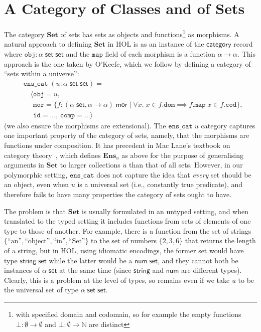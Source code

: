 \documentclass[twoside,titlepage,11pt]{article}
\begin{document}
\section{A Category of Classes and of Sets}%
\label{Set}
\newcommand{\Set}{\ensuremath{\mathbf{Set}}}
The category $\Set$ of sets has sets as objects and functions\footnote{with specified domain and codomain, so for example the empty functions $\bot:\emptyset\to\emptyset$ and $\bot:\emptyset\to\mathbb{N}$ are distinct} as morphisms.
A natural approach to defining $\Set$ in HOL is as an instance of the $\mathsf{category}$ record where $\mathtt{obj}:\alpha\;\mathsf{set}\;\mathsf{set}$ and the $\mathtt{map}$ field of each morphism is a function $\alpha\to\alpha$.
This approach is the one taken by O'Keefe, which we follow by defining a category of ``sets within a universe'':
\begin{align*}
&\mathtt{ens\_cat}\;(u:\alpha\;\mathsf{set}\;\mathsf{set})=\\
&\quad\langle\mathtt{obj}=u,\\
&\quad\phantom{\langle}\mathtt{mor}=\{f:(\alpha\;\mathsf{set},\alpha\to\alpha)\;\mathsf{mor}\mid \forall{x}.\;x\in f.\mathtt{dom}\implies f.\mathtt{map}\;x\in f.\mathtt{cod}\},\\
&\quad\phantom{\langle}\mathtt{id}=\dots,\,\mathtt{comp}=\dots\rangle
\end{align*}
(we also ensure the morphisms are extensional).
The $\mathtt{ens\_cat}\;u$ category captures one important property of the category of sets, namely, that the morphisms are functions under composition.
It has precedent in Mac Lane's textbook on category theory~\cite{MacLaneCFTWM}, which defines $\mathbf{Ens}_u$ as above for the purpose of generalising arguments in $\Set$ to larger collections $u$ than that of all sets.
However, in our polymorphic setting, $\mathtt{ens\_cat}$ does not capture the idea that \emph{every} set should be an object, even when $u$ is a universal set (i.e., constantly true predicate), and therefore fails to have many properties the category of sets ought to have.

The problem is that $\Set$ is usually formulated in an untyped setting, and when translated to the typed setting it includes functions from sets of elements of one type to those of another.
For example, there is a function from the set of strings $\{\text{``an''},\text{``object''},\text{``in''},\text{``Set''}\}$ to the set of numbers $\{2,3,6\}$ that returns the length of a string, but in HOL, using idiomatic encodings, the former set would have type $\mathsf{string}\;\mathsf{set}$ while the latter would be a $\mathsf{num}\;\mathsf{set}$, and they cannot both be instances of $\alpha\;\mathsf{set}$ at the same time (since $\mathsf{string}$ and $\mathsf{num}$ are different types).
Clearly, this is a problem at the level of types, so remains even if we take $u$ to be the universal set of type $\alpha\;\mathsf{set}\;\mathsf{set}$.
\end{document}
